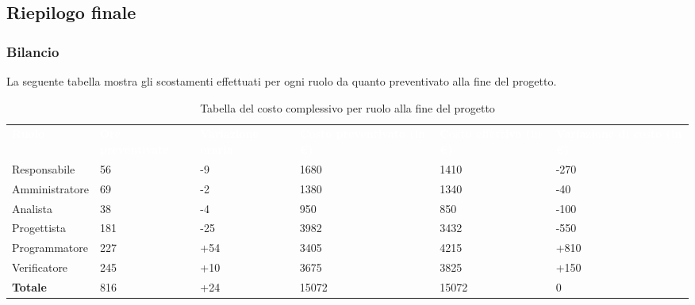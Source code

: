 \subsection{Riepilogo finale}

\subsubsection{Bilancio}
La seguente tabella mostra gli scostamenti effettuati per ogni ruolo da quanto preventivato alla fine del progetto.
{
\renewcommand{\arraystretch}{2}
\begin{longtable}[h]{ C{2.5cm} C{2.5cm} C{2.5cm} C{2.5cm} C{1.5cm} C{2.5cm}}
\caption{Tabella del costo complessivo per ruolo alla fine del progetto}\\

\textcolor{white}{\textbf{Ruolo}} & 
\textcolor{white}{\textbf{Ore preventivate}} & 
\textcolor{white}{\textbf{Variazione oraria}} & 
\textcolor{white}{\textbf{Costo preventivato (in \euro{})}} & 
\textcolor{white}{\textbf{Costo effettivo (in \euro{})}} & 
\textcolor{white}{\textbf{Variazione di costo (in \euro{})}}\\	
	
Responsabile    &  56 &  -9 &  1680 &  1410 & -270 \\
Amministratore  &  69 &  -2 &  1380 &  1340 &  -40 \\
Analista        &  38 &  -4 &   950 &   850 & -100 \\
Progettista     & 181 & -25 &  3982 &  3432 & -550 \\
Programmatore   & 227 & +54 &  3405 &  4215 & +810 \\
Verificatore    & 245 & +10 &  3675 &  3825 & +150 \\
\textbf{Totale} & 816 & +24 & 15072 & 15072 &    0 \\	

\end{longtable}
}

